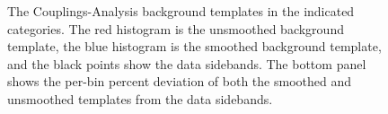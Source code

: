 \begin{figure}
\begin{center}
\caption{The Couplings-Analysis background templates in the indicated categories. The red histogram is the unsmoothed background template, the blue histogram is the smoothed background template, and the black points show the data sidebands. The bottom panel shows the per-bin percent deviation of both the smoothed and unsmoothed templates from the data sidebands. }
 \label{fig:gpr_coupcat_9}
 \end{center}
\end{figure}

